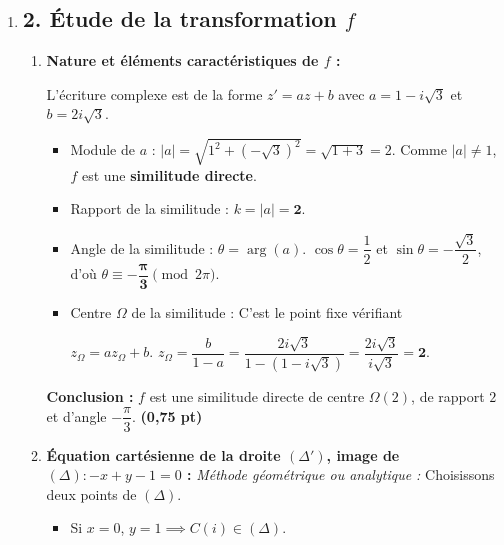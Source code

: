 \documentclass[12pt,a4paper]{article}
\begin{document}
\begin{enumerate}
\begin{enumerate}
\begin{itemize}
            Donc $z_2 = -(z_0 + z_1)$ : 
            
            $
            \begin{aligned}
            z_2 &= \left(\dfrac{2\sqrt{2} - \sqrt{6} - \sqrt{2}}{2}\right) + i\left(\dfrac{\sqrt{2} - \sqrt{6} - 2\sqrt{2}}{2}\right)\\
            &= \left(\dfrac{\sqrt{2}-\sqrt{6}}{2}\right) - i\left(\dfrac{\sqrt{6}+\sqrt{2}}{2}\right)
            \end{aligned}$.
        \end{itemize} \hfill \textbf{(0,5 pt)}
    \end{enumerate}

    \item \subsection*{2. Étude de la transformation $f$}
    \begin{enumerate}
        \item \textbf{Nature et éléments caractéristiques de $f$ :}
        
        L'écriture complexe est de la forme $z' = az + b$ avec $a = 1 - i\sqrt{3}$ et $b = 2i\sqrt{3}$.
        \begin{itemize}
            \item Module de $a$ : $|a| = \sqrt{1^2 + (-\sqrt{3})^2} = \sqrt{1+3} = 2$. Comme $|a| \neq 1$, $f$ est une \textbf{similitude directe}.
            \item Rapport de la similitude : $k = |a| = \mathbf{2}$.
            \item Angle de la similitude : $\theta = \arg(a)$. $\cos\theta = \dfrac{1}{2}$ et $\sin\theta = -\dfrac{\sqrt{3}}{2}$, d'où $\theta \equiv \mathbf{-\dfrac{\pi}{3}} \pmod{2\pi}$.
            \item Centre $\Omega$ de la similitude : C'est le point fixe vérifiant 
            
            $z_{\Omega} = a z_{\Omega} + b$.
            $z_{\Omega} = \dfrac{b}{1-a} = \dfrac{2i\sqrt{3}}{1 - (1 - i\sqrt{3})} = \dfrac{2i\sqrt{3}}{i\sqrt{3}} = \mathbf{2}$.
        \end{itemize}
        \textbf{Conclusion :} $f$ est une similitude directe de centre $\Omega(2)$, de rapport $2$ et d'angle $-\dfrac{\pi}{3}$. \hfill \textbf{(0,75 pt)}

        \item \textbf{Équation cartésienne de la droite $(\Delta')$, image de $(\Delta) : -x + y - 1 = 0$ :}
        \textit{Méthode géométrique ou analytique :} Choisissons deux points de $(\Delta)$.
        \begin{itemize}
            \item Si $x = 0$, $y = 1 \implies C(i) \in (\Delta)$. 
            

\end{itemize}
\end{enumerate}
\end{enumerate}
\end{document}
